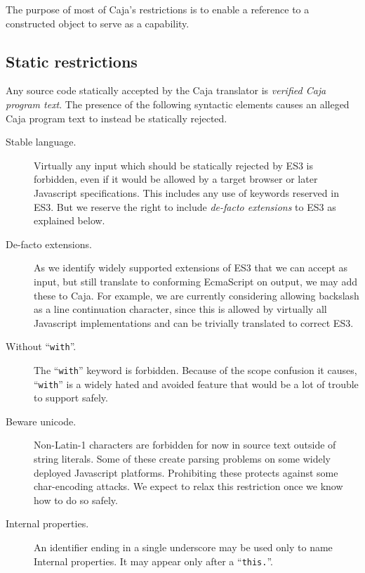 \documentclass[letterpaper,twocolumn,10pt]{article}
\newcommand{\code}[1]{{\tt {#1}}}              %
\begin{document}
The purpose of most of Caja's restrictions is to enable a reference to a 
constructed object to serve as a capability.

\subsection{Static restrictions}

Any source code statically accepted by the Caja translator is \emph{verified 
Caja program text}. The presence of the following syntactic elements causes 
an alleged Caja program text to instead be statically rejected.

\begin{description}

    \item[Stable language.] Virtually any input which should be statically 
    rejected by ES3 is forbidden, even if it would be allowed by a target 
    browser or later Javascript specifications. This includes any use of 
    keywords reserved in ES3. But we reserve the right to include 
    \emph{de-facto extensions} to ES3 as explained below.
    
    \item[De-facto extensions.] As we identify widely supported extensions of 
    ES3 that we can accept as input, but still translate to conforming 
    EcmaScript on output, we may add these to Caja. For example, we are 
    currently considering allowing backslash as a line continuation 
    character, since this is allowed by virtually all Javascript 
    implementations and can be trivially translated to correct ES3.

    \item[Without ``\code{with}''.] The ``\code{with}'' keyword is forbidden. 
    Because of the scope confusion it causes, ``\code{with}'' is a widely 
    hated and avoided feature that would be a lot of trouble to support 
    safely.

    \item[Beware unicode.] Non-Latin-1 characters are forbidden for now in 
    source text outside of string literals. Some of these create parsing 
    problems on some widely deployed Javascript platforms. Prohibiting these 
    protects against some char-encoding attacks. We expect to relax this 
    restriction once we know how to do so safely.

    \item[Internal properties.] An identifier ending in a single underscore 
    may be used only to name Internal properties. It may appear only after a 
    ``\code{this.}''.


\end{description}
\end{document}
